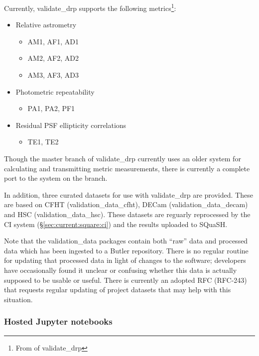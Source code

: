 \documentclass[DM,authoryear,toc,lsstdraft]{lsstdoc}
\begin{document}
Currently, validate\_drp supports the following \glspl{metric}\footnote{From
 of validate\_drp }:

\begin{itemize}
\item{Relative astrometry
  \begin{itemize}
    \item{AM1, AF1, AD1}
    \item{AM2, AF2, AD2}
    \item{AM3, AF3, AD3}
  \end{itemize}
}
\item{Photometric repeatability
  \begin{itemize}
    \item{PA1, PA2, PF1}
  \end{itemize}
}
\item{Residual PSF ellipticity correlations
  \begin{itemize}
    \item{TE1, TE2}
  \end{itemize}
}
\end{itemize}

Though the master branch of validate\_drp currently uses an older system for
calculating and transmitting \gls{metric} measurements, there is currently a complete
port to the  system on the  branch.

In addition, three curated datasets for use with validate\_drp are provided.
These are based on CFHT (validation\_data\_cfht), DECam
(validation\_data\_decam) and HSC (validation\_data\_hsc). These datasets are
reguarly reprocessed by the CI system (\S\ref{sec:current:square:ci}) and the
results uploaded to SQuaSH.

Note that the validation\_data packages contain both ``raw'' data and
processed data which has been ingested to a Butler repository. There is no
regular routine for updating that processed data in light of changes to the
software; developers have occasionally found it unclear or confusing whether
this data is actually supposed to be usable or useful. There is currently an
adopted RFC (RFC-243) that requests regular updating of project datasets that
may help with this situation.

\subsubsection{Hosted Jupyter notebooks}
\label{sec:current:square:jl}
\end{document}
